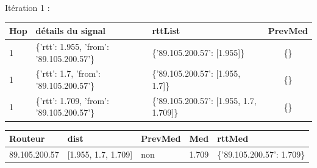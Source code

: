 \begin{landscape}
	
Itération 1 :
\begin{table}[H]
	\centering
	\begin{tabularx}{20cm}{|l|X|X|c|}
		\hline 
		\textbf{Hop} & \textbf{détails du signal}& \textbf{rttList}& \textbf{PrevMed}\\ \hline
 1 & \{'rtt': 1.955, 'from': '89.105.200.57'\} & \{'89.105.200.57': [1.955]\} & \{\} \\ \hline 
 1 & \{'rtt': 1.7, 'from': '89.105.200.57'\} & \{'89.105.200.57': [1.955, 1.7]\} & \{\} \\ \hline 
 1 & \{'rtt': 1.709, 'from': '89.105.200.57'\} & \{'89.105.200.57': [1.955, 1.7, 1.709]\} & \{\} \\ \hline 
	\end{tabularx}
\end{table}

\begin{table}[H]
	\centering
	\begin{tabularx}{20cm}{|l|X|X|c|X|}
		\hline 
		 \textbf{Routeur} & \textbf{dist} & \textbf{PrevMed}& \textbf{Med} & \textbf{rttMed} \\ \hline
89.105.200.57 & [1.955, 1.7, 1.709] & non & 1.709 &\{'89.105.200.57': 1.709\} \\ \hline
	\end{tabularx}
\end{table}
\end{landscape}

